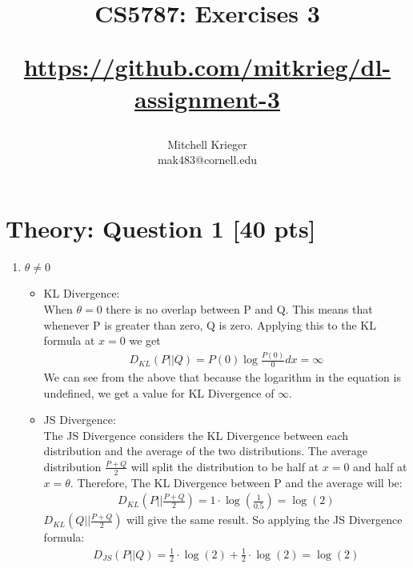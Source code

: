 \documentclass{article}
\title{CS5787: Exercises 3 \\ \begin{small}\url{https://github.com/mitkrieg/dl-assignment-3}\end{small}}
\author{Mitchell Krieger \\ mak483@cornell.edu}
\date{}
\begin{document}
\maketitle

\section{Theory: Question 1 [40 pts]}

\begin{enumerate}[label=\alph*)]
    \item $\theta \neq 0$
        \begin{itemize}
            \item KL Divergence: \\ When $\theta = 0$ there is no overlap between P and Q. This means that whenever P is greater than zero, Q is zero. Applying this to the 
            KL formula at $x=0$ we get
            \begin{equation}
                \begin{aligned}
                    D_{KL}(P||Q) =  P(0)\log \frac{P(0)}{0} dx = \infty
                \end{aligned}
            \end{equation}
            We can see from the above that because the logarithm in the equation is undefined, we get a value for KL Divergence of $\infty$.\\
            \item JS Divergence: \\ The JS Divergence considers the KL Divergence between each distribution and the average of the two distributions.
            The average distribution $\frac{P+Q}{2}$ will split the distribution to be half at $x = 0$ and half at $x = \theta$. Therefore, The KL Divergence between
            P and the average will be:
            \begin{equation}
                \begin{aligned}
                    D_{KL}(P||\frac{P+Q}{2}) =  1 \cdot \log(\frac{1}{0.5}) = \log(2)
                \end{aligned}
            \end{equation}
            $D_{KL}(Q||\frac{P+Q}{2})$ will give the same result. So applying the JS Divergence formula:
            \begin{equation}
                \begin{aligned}
                    D_{JS}(P||Q) = \frac{1}{2} \cdot \log(2) + \frac{1}{2} \cdot \log(2) = \log(2)

\end{aligned}
\end{equation}
\end{itemize}
\end{enumerate}
\end{document}
